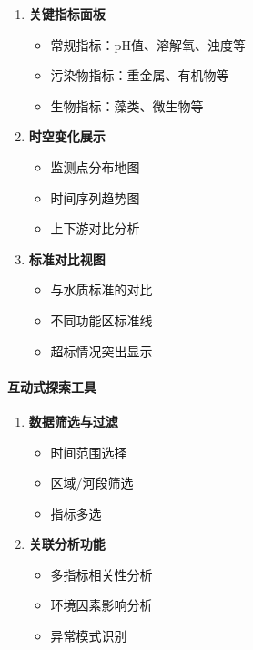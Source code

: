 \begin{enumerate}
\def\labelenumi{\arabic{enumi}.}
\tightlist
\item
  \textbf{关键指标面板}

  \begin{itemize}
  \tightlist
  \item
    常规指标：pH值、溶解氧、浊度等
  \item
    污染物指标：重金属、有机物等
  \item
    生物指标：藻类、微生物等
  \end{itemize}
\item
  \textbf{时空变化展示}

  \begin{itemize}
  \tightlist
  \item
    监测点分布地图
  \item
    时间序列趋势图
  \item
    上下游对比分析
  \end{itemize}
\item
  \textbf{标准对比视图}

  \begin{itemize}
  \tightlist
  \item
    与水质标准的对比
  \item
    不同功能区标准线
  \item
    超标情况突出显示
  \end{itemize}
\end{enumerate}

\paragraph{互动式探索工具}\label{ux4e92ux52a8ux5f0fux63a2ux7d22ux5de5ux5177}

\begin{enumerate}
\def\labelenumi{\arabic{enumi}.}
\tightlist
\item
  \textbf{数据筛选与过滤}

  \begin{itemize}
  \tightlist
  \item
    时间范围选择
  \item
    区域/河段筛选
  \item
    指标多选
  \end{itemize}
\item
  \textbf{关联分析功能}

  \begin{itemize}
  \tightlist
  \item
    多指标相关性分析
  \item
    环境因素影响分析
  \item
    异常模式识别
  \end{itemize}
\end{enumerate}

